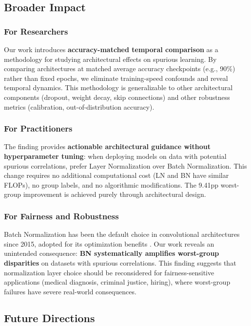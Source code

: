 \subsection{Broader Impact}

\subsubsection{For Researchers}

Our work introduces \textbf{accuracy-matched temporal comparison} as a methodology for studying architectural effects on spurious learning. By comparing architectures at matched average accuracy checkpoints (e.g., 90\%) rather than fixed epochs, we eliminate training-speed confounds and reveal temporal dynamics. This methodology is generalizable to other architectural components (dropout, weight decay, skip connections) and other robustness metrics (calibration, out-of-distribution accuracy).

\subsubsection{For Practitioners}

The finding provides \textbf{actionable architectural guidance without hyperparameter tuning}: when deploying models on data with potential spurious correlations, prefer Layer Normalization over Batch Normalization. This change requires no additional computational cost (LN and BN have similar FLOPs), no group labels, and no algorithmic modifications. The 9.41pp worst-group improvement is achieved purely through architectural design.

\subsubsection{For Fairness and Robustness}

Batch Normalization has been the default choice in convolutional architectures since 2015, adopted for its optimization benefits \cite{santurkar2018does}. Our work reveals an unintended consequence: \textbf{BN systematically amplifies worst-group disparities} on datasets with spurious correlations. This finding suggests that normalization layer choice should be reconsidered for fairness-sensitive applications (medical diagnosis, criminal justice, hiring), where worst-group failures have severe real-world consequences.

\subsection{Future Directions}

